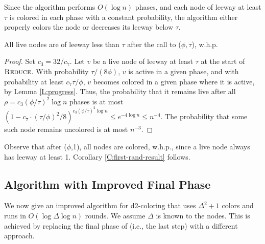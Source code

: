 Since the algorithm performs $O(\log n)$ phases, and each node of leeway at least $\tau$ is colored in each phase with a constant probability, the algorithm either properly colors the node or decreases its leeway below $\tau$.

\begin{theorem}
All live nodes are of leeway less than $\tau$ after the call to ($\phi,\tau$), w.h.p.
\label{T:reduce-correct}
\end{theorem}

\begin{proof}
Set $c_3 = 32/c_7$. 
Let $v$ be a live node of leeway at least $\tau$ at the start of $\textsc{Reduce}$.
With probability $\tau/(8\phi)$, $v$ is active in a given phase, and with
probability at least $c_7 \tau/\phi$, $v$ becomes colored in a given phase where it is active, by Lemma \ref{L:progress}. Thus, the probability that it remains live after all $\rho = c_3 (\phi/\tau)^2 \log n$ phases is at most 
$(1-c_7\cdot(\tau/\phi)^2/8)^{c_3 (\phi/\tau)^2 \log n} \le e^{-4\log n} \le n^{-4}$.
The probability that some such node remains uncolored is at most $n^{-3}$.
\end{proof}


Observe that after ($\phi$,1), all nodes are colored, w.h.p., since a live node always has leeway at least 1. 
Corollary \ref{C:first-rand-result} follows.


\subsection{Algorithm with Improved Final Phase}
\label{ssec:improved}

We now give an improved algorithm for d2-coloring that uses $\Delta^2+1$ colors and runs in $O(\log \Delta\log n)$ rounds. We assume $\Delta$ is known to the nodes.
This is achieved by replacing the final phase of  (i.e., the last step) with a different approach.

